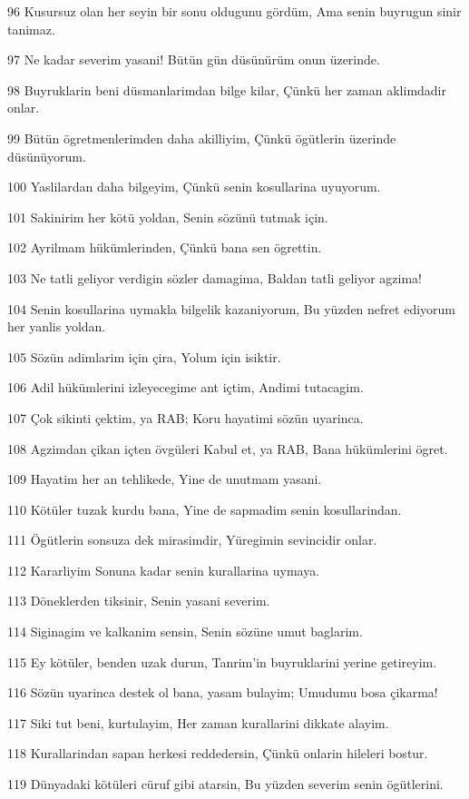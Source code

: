 \par 96 Kusursuz olan her seyin bir sonu oldugunu gördüm, Ama senin buyrugun sinir tanimaz.
\par 97 Ne kadar severim yasani! Bütün gün düsünürüm onun üzerinde.
\par 98 Buyruklarin beni düsmanlarimdan bilge kilar, Çünkü her zaman aklimdadir onlar.
\par 99 Bütün ögretmenlerimden daha akilliyim, Çünkü ögütlerin üzerinde düsünüyorum.
\par 100 Yaslilardan daha bilgeyim, Çünkü senin kosullarina uyuyorum.
\par 101 Sakinirim her kötü yoldan, Senin sözünü tutmak için.
\par 102 Ayrilmam hükümlerinden, Çünkü bana sen ögrettin.
\par 103 Ne tatli geliyor verdigin sözler damagima, Baldan tatli geliyor agzima!
\par 104 Senin kosullarina uymakla bilgelik kazaniyorum, Bu yüzden nefret ediyorum her yanlis yoldan.
\par 105 Sözün adimlarim için çira, Yolum için isiktir.
\par 106 Adil hükümlerini izleyecegime ant içtim, Andimi tutacagim.
\par 107 Çok sikinti çektim, ya RAB; Koru hayatimi sözün uyarinca.
\par 108 Agzimdan çikan içten övgüleri Kabul et, ya RAB, Bana hükümlerini ögret.
\par 109 Hayatim her an tehlikede, Yine de unutmam yasani.
\par 110 Kötüler tuzak kurdu bana, Yine de sapmadim senin kosullarindan.
\par 111 Ögütlerin sonsuza dek mirasimdir, Yüregimin sevincidir onlar.
\par 112 Kararliyim Sonuna kadar senin kurallarina uymaya.
\par 113 Döneklerden tiksinir, Senin yasani severim.
\par 114 Siginagim ve kalkanim sensin, Senin sözüne umut baglarim.
\par 115 Ey kötüler, benden uzak durun, Tanrim'in buyruklarini yerine getireyim.
\par 116 Sözün uyarinca destek ol bana, yasam bulayim; Umudumu bosa çikarma!
\par 117 Siki tut beni, kurtulayim, Her zaman kurallarini dikkate alayim.
\par 118 Kurallarindan sapan herkesi reddedersin, Çünkü onlarin hileleri bostur.
\par 119 Dünyadaki kötüleri cüruf gibi atarsin, Bu yüzden severim senin ögütlerini.
